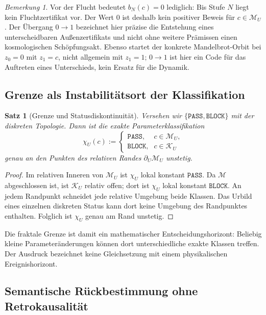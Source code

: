 \documentclass[11pt,a4paper]{article}
\newtheorem{satz}{Satz}[section]
\theoremstyle{remark}
\newtheorem{bemerkung}{Bemerkung}[section]
\newcommand{\M}{\mathcal{M}}
\newcommand{\K}{\mathcal{K}}
\newcommand{\PASS}{\texttt{PASS}}
\newcommand{\BLOCK}{\texttt{BLOCK}}
\begin{document}
\begin{bemerkung}
Vor der Flucht bedeutet \(b_N(c)=0\) lediglich: Bis Stufe \(N\) liegt kein
Fluchtzertifikat vor. Der Wert \(0\) ist deshalb kein positiver Beweis für
\(c\in\M_U\). Der Übergang \(0\to1\) bezeichnet hier präzise die Entstehung
eines unterscheidbaren Außenzertifikats und nicht ohne weitere Prämissen einen
kosmologischen Schöpfungsakt. Ebenso startet der konkrete Mandelbrot-Orbit bei
\(z_0=0\) mit \(z_1=c\), nicht allgemein mit \(z_1=1\); \(0\to1\) ist hier
ein Code für das Auftreten eines Unterschieds, kein Ersatz für die Dynamik.
\end{bemerkung}

\subsection{Grenze als Instabilitätsort der Klassifikation}

\begin{satz}[Grenze und Statusdiskontinuität]
\label{satz:grenzklassifikation}
Versehen wir \(\{\PASS,\BLOCK\}\) mit der diskreten Topologie. Dann ist
die exakte Parameterklassifikation
\[
  \chi_U(c):=
  \begin{cases}
    \PASS,&c\in\M_U,\\
    \BLOCK,&c\in\K_U
  \end{cases}
\]
genau an den Punkten des relativen Randes \(\partial_U\M_U\) unstetig.
\end{satz}

\begin{proof}
Im relativen Inneren von \(\M_U\) ist \(\chi_U\) lokal konstant \(\PASS\).
Da \(\M\) abgeschlossen ist, ist \(\K_U\) relativ offen; dort ist
\(\chi_U\) lokal konstant \(\BLOCK\). An jedem Randpunkt schneidet jede
relative Umgebung beide Klassen. Das Urbild eines einzelnen diskreten Status
kann dort keine Umgebung des Randpunktes enthalten. Folglich ist \(\chi_U\)
genau am Rand unstetig.
\end{proof}

Die fraktale Grenze ist damit ein mathematischer Entscheidungshorizont:
Beliebig kleine Parameteränderungen können dort unterschiedliche exakte
Klassen treffen. Der Ausdruck bezeichnet keine Gleichsetzung mit einem
physikalischen Ereignishorizont.

\subsection{Semantische Rückbestimmung ohne Retrokausalität}
\end{document}
